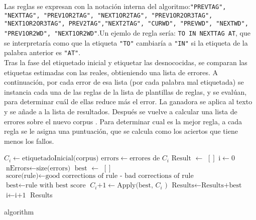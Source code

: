 Las reglas se expresan con la notación interna del algoritmo:\newline \texttt{"PREVTAG", "NEXTTAG", "PREV1OR2TAG", "NEXT1OR2TAG", "PREV1OR2OR3TAG", "NEXT1OR2OR3TAG", PREV2TAG","NEXT2TAG",
 "CURWD", "PREVWD", "NEXTWD", "PREV1OR2WD", "NEXT1OR2WD"}.\newline Un ejemlo de regla sería: \textcolor{SchoolColor}{\texttt{TO IN NEXTTAG AT}}, que se interpretaría como que la etiqueta \texttt{"TO"} cambiaría a \texttt{"IN"} si la etiqueta de la palabra anterior es \texttt{"AT"}. \\[\baselineskip]
 Tras la fase del etiquetado inicial y etiquetar las desnococidas, se comparan las etiquetas estimadas con las reales, obtieniendo una lista de errores. A continuación, por cada error de esa lista (por cada palabra mal etiquetada) se instancia cada una de las reglas de la lista de plantillas de reglas, y se evalúan, para determinar cuál de ellas reduce más el error. La ganadora se aplica al texto y se añade a la lista de resultados. Después se vuelve a calcular una lista de errores sobre el nuevo corpus . \newline
 Para determinar cual es la mejor regla, a cada regla se le asigna una puntuación, que se calcula como   
 los aciertos que tiene menos los fallos.    


\begin{algorithm}
    \begin{algorithmic}[1]
    \State $\text{$C_{i}$} \gets \text{etiquetadoInicial(corpus)}$
\State $\text{errors} \gets \text{errores de $C_{i}$}$
\State $\text{Result}$ $\gets$ $[ ]$
\State $\text{i} \gets 0$
\State $\text{nErrors} \gets \text{size(errors)}$
\State $\text{best}$  $\gets$ $[ ]$
            \State $\text{score(rule)} \gets \text{good corrections of rule - bad corrections of rule}$ 
            \EndFor
        \EndFor
        \State $\text{best} \gets \text{rule with best score}$
		\State $\text{$C_{i}$+1} \gets \text{Apply(best, $C_{i}$ )}$
		\State $\text{Results} \gets \text{Results+best}$
		\State $\text{i} \gets \text{i+1}$
        \EndWhile
        \EndProcedure
        \BState \Return Results
    \end{algorithmic}
    \label{alg:rAP}
    \caption{algorithm}
\end{algorithm}

